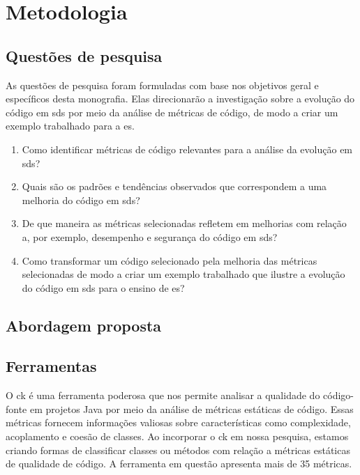 
\chapter{Metodologia}\label{cap:Metodologia}

\section{Questões de pesquisa}
As questões de pesquisa foram formuladas com base nos objetivos geral e específicos desta monografia. Elas direcionarão a investigação sobre a evolução do código em \gls{sds} por meio da análise de métricas de código, de modo a criar um exemplo trabalhado para a \gls{es}.

\begin{enumerate}
    \item Como identificar métricas de código relevantes para a análise da evolução em \gls{sds}?
    
    \item Quais são os padrões e tendências observados que correspondem a uma melhoria do código em \gls{sds}?
    
    \item De que maneira as métricas selecionadas refletem em melhorias com relação a, por exemplo, desempenho e segurança do código em \gls{sds}?
    
    \item Como transformar um código selecionado pela melhoria das métricas selecionadas de modo a criar um exemplo trabalhado que ilustre a evolução do código em \gls{sds} para o ensino de \gls{es}?
\end{enumerate}

\section{Abordagem proposta}

\section{Ferramentas}\label{sec:ferramentas}
O \gls{ck} \cite{aniche-ck} é uma ferramenta poderosa que nos permite analisar a qualidade do código-fonte em projetos Java por meio da análise de métricas estáticas de código. Essas métricas fornecem informações valiosas sobre características como complexidade, acoplamento e coesão de classes. Ao incorporar o \gls{ck} em nossa pesquisa, estamos criando formas de classificar classes ou métodos com relação a métricas estáticas de qualidade de código. A ferramenta em questão apresenta mais de 35 métricas.

